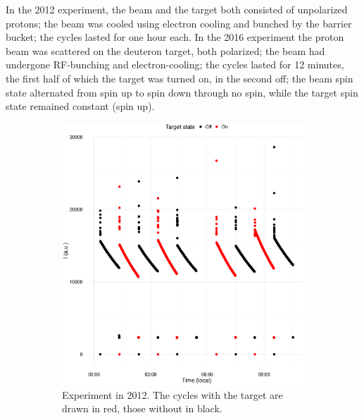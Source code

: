 \documentclass[reprint]{revtex4-1}
\newcommand{\scl}{.4}
\begin{document}
In the 2012 experiment, the beam and the target both consisted of unpolarized protons; the beam was cooled using electron cooling and bunched by the barrier bucket; the cycles lasted for one hour each. In the 2016 experiment the proton beam was scattered on the deuteron target, both polarized; the beam had undergone RF-bunching and electron-cooling; the cycles lasted for 12 minutes, the first half of which the target was turned on, in the second off; the beam spin state alternated from spin up to spin down through no spin, while the target spin state remained constant (spin up). 

\begin{figure}[h]
\begin{subfigure}{.5\textwidth}
\includegraphics[scale=\scl]{img/Cycles2012.eps}
\caption{Experiment in 2012. The cycles with the target are drawn in red, those without in black. \label{fig:Cycs2012}}
\end{subfigure}
\begin{subfigure}{.5\textwidth}

\end{subfigure}
\end{figure}
\end{document}
